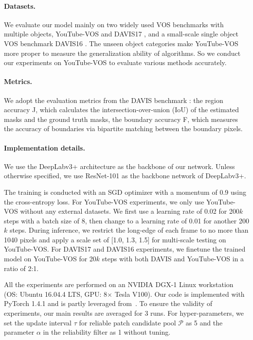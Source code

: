 \documentclass[letterpaper]{article} \usepackage{aaai22}  \usepackage{times}  \usepackage{helvet}  \usepackage{courier}  \usepackage[hyphens]{url}  \usepackage{graphicx} \urlstyle{rm} \def\UrlFont{\rm}  \usepackage{natbib}  \usepackage{caption} \DeclareCaptionStyle{ruled}{labelfont=normalfont,labelsep=colon,strut=off} \frenchspacing  \setlength{\pdfpagewidth}{8.5in}  \setlength{\pdfpageheight}{11in}  \usepackage{algorithm}
\begin{document}
\paragraph{Datasets.} We evaluate our model mainly on two widely used VOS benchmarks with multiple objects, YouTube-VOS \cite{xu2018youtube} and DAVIS17 \cite{pont20172017}, and a small-scale single object VOS benchmark DAVIS16 \cite{perazzi2016benchmark}.
The unseen object categories make YouTube-VOS more proper to measure the generalization ability of algorithms. So we conduct our experiments on YouTube-VOS to evaluate various methods accurately. 

\paragraph{Metrics.} We adopt the evaluation metrics from the DAVIS benchmark \cite{perazzi2016benchmark}: the region accuracy J, which calculates the intersection-over-union (IoU) of the estimated masks and the ground truth masks, the boundary accuracy F, which measures the accuracy of boundaries via bipartite matching between the boundary pixels. 

\paragraph{Implementation details.}

We use the DeepLabv3+ \cite{chen2018encoder} architecture as the backbone of our network. 
Unless otherwise specified, we use ResNet-101 as the backbone network of DeepLabv3+.

The training is conducted with an SGD optimizer with a momentum of 0.9 using the cross-entropy loss.
For YouTube-VOS experiments, we only use YouTube-VOS without any external datasets. We first use a learning rate of 0.02 for 200$k$ steps with a batch size of 8, then change to a learning rate of 0.01 for another 200$k$ steps. 
During inference, we restrict the long-edge of each frame to no more than 1040 pixels and apply a scale set of [1.0, 1.3, 1.5] for multi-scale testing on YouTube-VOS. For DAVIS17 and DAVIS16 experiments, we finetune the trained model on YouTube-VOS for 20$k$ steps with both DAVIS and YouTube-VOS in a ratio of 2:1. 

All the experiments are performed on an NVIDIA DGX-1 Linux workstation (OS: Ubuntu 16.04.4 LTS, GPU: 8$\times$ Tesla V100). Our code is implemented with PyTorch 1.4.1 and is partly leveraged from~\cite{CFBI_REPO}. To ensure the validity of experiments, our main results are averaged for 3 runs. For hyper-parameters, we set the update interval $\tau$ for reliable patch candidate pool $\mathcal{P}$ as 5 and the parameter $\alpha$ in the reliability filter as 1 without tuning.
\end{document}
